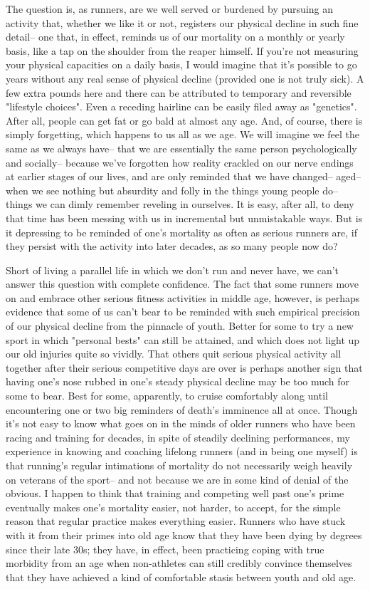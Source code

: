 The question is, as runners, are we well served or burdened by pursuing an activity that, whether we like it or not, registers our physical decline in such fine detail-- one that, in effect, reminds us of our mortality on a monthly or yearly basis, like a tap on the shoulder from the reaper himself. If you're not measuring your physical capacities on a daily basis, I would imagine that it's possible to go years without any real sense of physical decline (provided one is not truly sick). A few extra pounds here and there can be attributed to temporary and reversible "lifestyle choices". Even a receding hairline can be easily filed away as "genetics". After all, people can get fat or go bald at almost any age. And, of course, there is simply forgetting, which happens to us all as we age. We will imagine we feel the same as we always have-- that we are essentially the same person psychologically and socially-- because we've forgotten how reality crackled on our nerve endings at earlier stages of our lives, and are only reminded that we have changed-- aged-- when we see nothing but absurdity and folly in the things young people do-- things we can dimly remember reveling in ourselves. It is easy, after all, to deny that time has been messing with us in incremental but unmistakable ways. But is it depressing to be reminded of one's mortality as often as serious runners are, if they persist with the activity into later decades, as so many people now do?

Short of living a parallel life in which we don't run and never have, we can't answer this question with complete confidence. The fact that some runners move on and embrace other serious fitness activities in middle age, however, is perhaps evidence that some of us can't bear to be reminded with such empirical precision of our physical decline from the pinnacle of youth. Better for some to try a new sport in which "personal bests" can still be attained, and which does not light up our old injuries quite so vividly. That others quit serious physical activity all together after their serious competitive days are over is perhaps another sign that having one's nose rubbed in one's steady physical decline may be too much for some to bear. Best for some, apparently, to cruise comfortably along until encountering one or two big reminders of death's imminence all at once. Though it's not easy to know what goes on in the minds of older runners who have been racing and training for decades, in spite of steadily declining performances, my experience in knowing and coaching lifelong runners (and in being one myself) is that running's regular intimations of mortality do not necessarily weigh heavily on veterans of the sport-- and not because we are in some kind of denial of the obvious. I happen to think that training and competing well past one's prime eventually makes one's mortality easier, not harder, to accept, for the simple reason that regular practice makes everything easier. Runners who have stuck with it from their primes into old age know that they have been dying by degrees since their late 30s; they have, in effect, been practicing coping with true morbidity from an age when non-athletes can still credibly convince themselves that they have achieved a kind of comfortable stasis between youth and old age.

